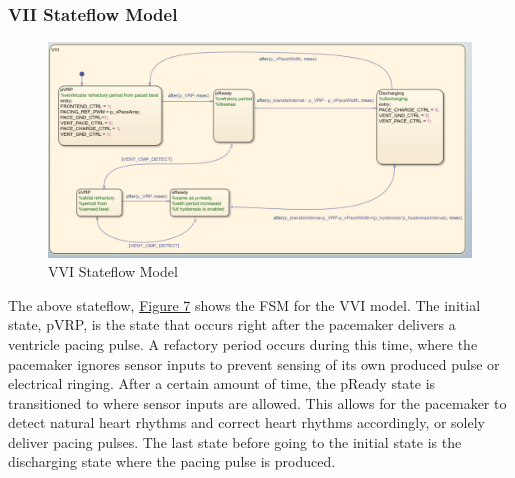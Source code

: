 \documentclass{article}
\begin{document}
\subsubsection{VII Stateflow Model}
\begin{tcolorbox}
    \begin{figure}[H]
        \includegraphics[width=\textwidth]{VVI.png}
        \caption{VVI Stateflow Model}
        \label{VVISF}
    \end{figure}
\end{tcolorbox}
The above stateflow, \hyperref[VVISF]{Figure 7} shows the FSM for the VVI model. The initial state, pVRP, is the state 
that occurs right after the pacemaker delivers a ventricle pacing pulse. A refactory period occurs during this time, where the 
pacemaker ignores sensor inputs to prevent sensing of its own produced pulse or electrical ringing. After a certain amount of time,
the pReady state is transitioned to where sensor inputs are allowed. This allows for the pacemaker to detect natural heart rhythms
and correct heart rhythms accordingly, or solely deliver pacing pulses. The last state before going to the initial state is the 
discharging state where the pacing pulse is produced. 

\newpage
\end{document}
